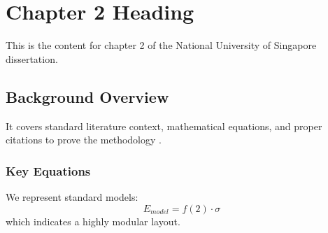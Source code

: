 \chapter{Chapter 2 Heading}
\label{ch:chapter2}
This is the content for chapter 2 of the National University of Singapore dissertation.

\section{Background Overview}
It covers standard literature context, mathematical equations, and proper citations to prove the methodology \cite{texbook}.

\subsection{Key Equations}
We represent standard models:
\begin{equation}
    E_{model} = f(2) \cdot \sigma
\end{equation}
which indicates a highly modular layout.
